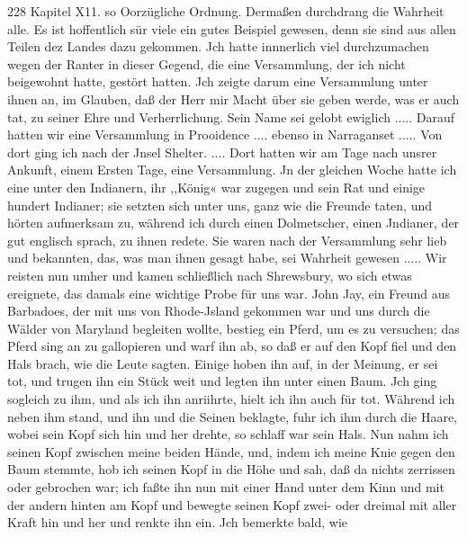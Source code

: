 228 Kapitel X11.
so Oorzügliche Ordnung. Dermaßen durchdrang die Wahrheit
alle. Es ist hoffentlich sür viele ein gutes Beispiel gewesen, denn
sie sind aus allen Teilen dez Landes dazu gekommen. Jch hatte
innnerlich viel durchzumachen wegen der Ranter in dieser Gegend,
die eine Versammlung, der ich nicht beigewohnt hatte, gestört
hatten. Jch zeigte darum eine Versammlung unter ihnen an, im
Glauben, daß der Herr mir Macht über sie geben werde, was
er auch tat, zu seiner Ehre und Verherrlichung. Sein Name
sei gelobt ewiglich .....
Darauf hatten wir eine Versammlung in Prooidence ....
ebenso in Narraganset ..... Von dort ging ich nach der Jnsel
Shelter. .... Dort hatten wir am Tage nach unsrer Ankunft,
einem Ersten Tage, eine Versammlung. Jn der gleichen Woche hatte
ich eine unter den Indianern, ihr ,,König« war zugegen und sein
Rat und einige hundert Indianer; sie setzten sich unter uns, ganz
wie die Freunde taten, und hörten aufmerksam zu, während ich
durch einen Dolmetscher, einen Jndianer, der gut englisch sprach,
zu ihnen redete. Sie waren nach der Versammlung sehr lieb
und bekannten, das, was man ihnen gesagt habe, sei Wahrheit
gewesen .....
Wir reisten nun umher und kamen schließlich nach Shrewsbury,
wo sich etwas ereignete, das damals eine wichtige Probe für uns
war. John Jay, ein Freund aus Barbadoes, der mit uns von
Rhode-Jsland gekommen war und uns durch die Wälder von
Maryland begleiten wollte, bestieg ein Pferd, um es zu versuchen;
das Pferd sing an zu gallopieren und warf ihn ab, so daß er
auf den Kopf fiel und den Hals brach, wie die Leute sagten.
Einige hoben ihn auf, in der Meinung, er sei tot, und trugen
ihn ein Stück weit und legten ihn unter einen Baum. Jch ging
sogleich zu ihm, und als ich ihn anriihrte, hielt ich ihn auch für
tot. Während ich neben ihm stand, und ihn und die Seinen
beklagte, fuhr ich ihm durch die Haare, wobei sein Kopf sich hin
und her drehte, so schlaff war sein Hals. Nun nahm ich seinen
Kopf zwischen meine beiden Hände, und, indem ich meine Knie
gegen den Baum stemmte, hob ich seinen Kopf in die Höhe und
sah, daß da nichts zerrissen oder gebrochen war; ich faßte ihn
nun mit einer Hand unter dem Kinn und mit der andern hinten
am Kopf und bewegte seinen Kopf zwei- oder dreimal mit aller
Kraft hin und her und renkte ihn ein. Jch bemerkte bald, wie


